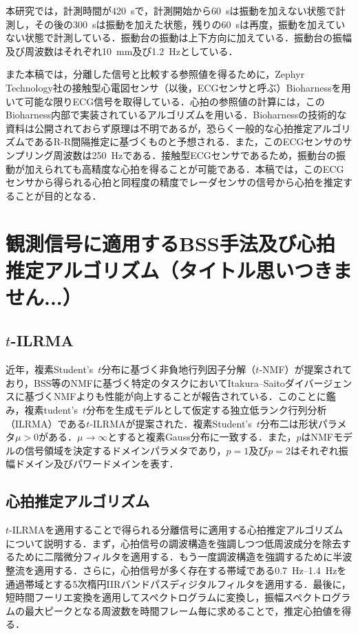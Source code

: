 \documentclass[a4j]{jsarticle}
\begin{document}
本研究では，計測時間が420~sで，計測開始から60~sは振動を加えない状態で計測し，その後の300~sは振動を加えた状態，残りの60~sは再度，振動を加えていない状態で計測している．振動台の振動は上下方向に加えている．振動台の振幅及び周波数はそれぞれ10~mm及び1.2~Hzとしている．

また本稿では，分離した信号と比較する参照値を得るために，Zephyr Technology社の接触型心電図センサ（以後，ECGセンサと呼ぶ）Bioharness\cite{bioharness}を用いて可能な限りECG信号を取得している．心拍の参照値の計算には，このBioharness内部で実装されているアルゴリズムを用いる．Bioharnessの技術的な資料は公開されておらず原理は不明であるが，恐らく一般的な心拍推定アルゴリズムであるR-R間隔推定に基づくものと予想される．また，このECGセンサのサンプリング周波数は250~Hzである．接触型ECGセンサであるため，振動台の振動が加えられても高精度な心拍を得ることが可能である．本稿では，このECGセンサから得られる心拍と同程度の精度でレーダセンサの信号から心拍を推定することが目的となる．

\section{観測信号に適用するBSS手法及び心拍推定アルゴリズム（タイトル思いつきません...）}

\subsection{$t$-ILRMA}
近年，複素Student's~$t$分布に基づく非負地行列因子分解（$t$-NMF）が提案されており，BSS等のNMFに基づく特定のタスクにおいてItakura--Saitoダイバージェンスに基づくNMF\cite{isnmf}よりも性能が向上することが報告されている．このことに鑑み，複素tudent's~$t$分布を生成モデルとして仮定する独立低ランク行列分析（ILRMA）\cite{ILRMA}である$t$-ILRMAが提案された\cite{tdist1}．複素Student's~$t$分布二は形状パラメタ$\mu >0$がある．$\mu \rightarrow \infty$とすると複素Gauss分布に一致する．また，$p$はNMFモデルの信号領域を決定するドメインパラメタであり，$p=1$及び$p=2$はそれぞれ振幅ドメイン及びパワードメインを表す．

\subsection{心拍推定アルゴリズム}
$t$-ILRMAを適用することで得られる分離信号に適用する心拍推定アルゴリズムについて説明する．まず，心拍信号の調波構造を強調しつつ低周波成分を除去するために二階微分フィルタを適用する．もう一度調波構造を強調するために半波整流を適用する．さらに，心拍信号が多く存在する帯域である0.7~Hz--1.4~Hzを通過帯域とする5次楕円IIRバンドパスディジタルフィルタを適用する．最後に，短時間フーリエ変換を適用してスペクトログラムに変換し，振幅スペクトログラムの最大ピークとなる周波数を時間フレーム毎に求めることで，推定心拍値を得る．
\end{document}
